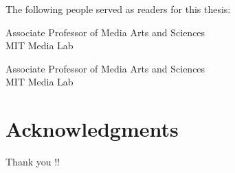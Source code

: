 %
%
%

\begin{titlepage}
\begin{large}
The following people served as readers for this thesis:

\signature{Sepandar Kamvar}{Associate Professor of Media Arts and Sciences \\
   MIT Media Lab}

\signature{Iyad Rahwan}{Associate Professor of Media Arts and Sciences \\
   MIT Media Lab}
 
\end{large}
\end{titlepage}
 
\cleardoublepage

\section*{Acknowledgments}

Thank you !!





